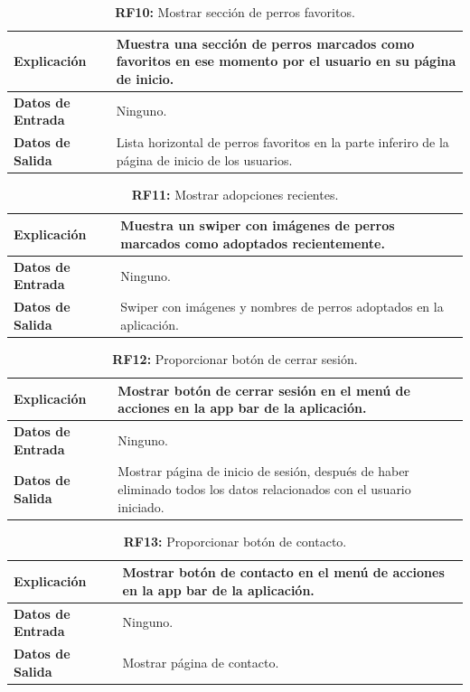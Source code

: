\documentclass[a4paper, 12pt]{article}
\begin{document}
\begin{table}[H]
\captionsetup{justification=raggedright,singlelinecheck=false}
\caption{\textbf{RF10:} Mostrar sección de perros favoritos. }
\label{tab:RF10}
	\begin{tabular}{|m{5cm}|m{10cm}|}
	\hline
	\textbf{Explicación} & Muestra una sección de perros marcados como favoritos en ese momento por el usuario en su página de inicio. \\ 
	\hline
	\textbf{Datos de Entrada} & Ninguno. \\ 
	\hline
	\textbf{Datos de Salida} & Lista horizontal de perros favoritos en la parte inferiro de la página de inicio de los usuarios. \\ 
	\hline
\end{tabular}
\end{table}

\begin{table}[H]
\captionsetup{justification=raggedright,singlelinecheck=false}
\caption{\textbf{RF11:} Mostrar adopciones recientes.}
\label{tab:RF11}
	\begin{tabular}{|m{5cm}|m{10cm}|}
	\hline
	\textbf{Explicación} & Muestra un swiper con imágenes de perros marcados como adoptados recientemente. \\ 
	\hline
	\textbf{Datos de Entrada} & Ninguno. \\ 
	\hline
	\textbf{Datos de Salida} & Swiper con imágenes y nombres de perros adoptados en la aplicación. \\ 
	\hline
\end{tabular}
\end{table}

\begin{table}[H]
\captionsetup{justification=raggedright,singlelinecheck=false}
\caption{\textbf{RF12:} Proporcionar botón de cerrar sesión.}
\label{tab:RF12}
	\begin{tabular}{|m{5cm}|m{10cm}|}
	\hline
	\textbf{Explicación} & Mostrar botón de cerrar sesión en el menú de acciones en la app bar de la aplicación. \\ 
	\hline
	\textbf{Datos de Entrada} & Ninguno. \\ 
	\hline
	\textbf{Datos de Salida} & Mostrar página de inicio de sesión, después de haber eliminado todos los datos relacionados con el usuario iniciado. \\ 
	\hline
\end{tabular}
\end{table}

\begin{table}[H]
\captionsetup{justification=raggedright,singlelinecheck=false}
\caption{\textbf{RF13:} Proporcionar botón de contacto.}
\label{tab:RF13}
	\begin{tabular}{|m{5cm}|m{10cm}|}
	\hline
	\textbf{Explicación} & Mostrar botón de contacto en el menú de acciones en la app bar de la aplicación. \\ 
	\hline
	\textbf{Datos de Entrada} & Ninguno. \\ 
	\hline
	\textbf{Datos de Salida} & Mostrar página de contacto. \\ 
	\hline
\end{tabular}
\end{table}
\end{document}
